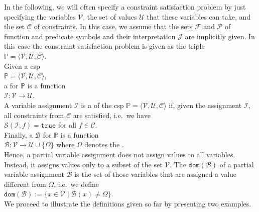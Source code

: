 In the following, we will often specify a constraint satisfaction problem by just specifying the variables
$\mathcal{V}$,  the set of values $\mathcal{U}$ that these variables can take, and the set $\mathcal{C}$ of
constraints.  In this case, we assume that the sets $\mathcal{F}$ and $\mathcal{P}$ of function and predicate
symbols and their interpretation $\mathcal{J}$ are implicitly given.  In this case the constraint satisfaction
problem is given as the triple 
\\[0.2cm]
\hspace*{1.3cm}
$\mathbb{P} = \langle \mathcal{V}, \mathcal{U}, \mathcal{C} \rangle$.
\\[0.2cm]
Given a \Gls{csp}
\\[0.2cm]
\hspace*{1.3cm}
 $\mathbb{P} = \langle \mathcal{V}, \mathcal{U}, \mathcal{C} \rangle$, 
\\[0.2cm]
a  for $\mathbb{P}$ is a function
\\[0.2cm]
\hspace*{1.3cm}
$\mathcal{I}: \mathcal{V} \rightarrow \mathcal{U}$.
\\[0.2cm]
A variable assignment $\mathcal{I}$ is a  of the \Gls{csp}
$\mathbb{P}= \langle \mathcal{V}, \mathcal{U}, \mathcal{C} \rangle$ 
if, given the assignment $\mathcal{I}$, all constraints from $\mathcal{C}$ are satisfied, i.e.~we have
\\[0.2cm]
\hspace*{1.3cm}
$\mathcal{S}(\mathcal{I}, f) = \mathtt{true}$ \quad for all $f \in \mathcal{C}$.
\\[0.2cm]
Finally, a   $\mathcal{B}$ for $\mathbb{P}$ is a function
\\[0.2cm]
\hspace*{1.3cm}
$\mathcal{B}: \mathcal{V} \rightarrow \mathcal{U} \cup \{ \Omega \}$ \quad where $\Omega$ denotes the
. 
\\[0.2cm]
Hence, a partial variable assignment does not assign values to all variables.  Instead, it assigns values only
to a subset of the set $\mathcal{V}$.  The  $\mathtt{dom}(\mathcal{B})$  of a partial variable assignment $\mathcal{B}$ is the
set of those variables that are assigned a value different from $\Omega$, i.e.~we define
\\[0.2cm]
\hspace*{1.3cm}
$\mathtt{dom}(\mathcal{B}) := \bigl\{ x \in \mathcal{V} \mid \mathcal{B}(x) \not= \Omega \bigr\}$.
\\[0.2cm]
We proceed to illustrate the definitions given so far by presenting two examples.


